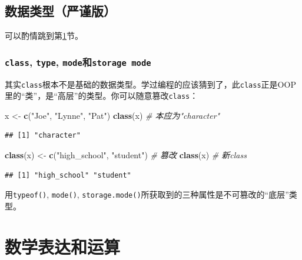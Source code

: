 \documentclass[]{book}
\newenvironment{Shaded}{\begin{snugshade}}{\end{snugshade}}
\newcommand{\CommentTok}[1]{\textcolor[rgb]{0.56,0.35,0.01}{\textit{#1}}}
\newcommand{\KeywordTok}[1]{\textcolor[rgb]{0.13,0.29,0.53}{\textbf{#1}}}
\newcommand{\NormalTok}[1]{#1}
\newcommand{\StringTok}[1]{\textcolor[rgb]{0.31,0.60,0.02}{#1}}
\begin{document}
\hypertarget{data-types-advanced}{%
\subsection{数据类型（严谨版）}\label{data-types-advanced}}

可以酌情跳到第\ref{math}节。

\hypertarget{class-type-modestorage-mode}{%
\subsubsection{\texorpdfstring{\texttt{class}, \texttt{type}, \texttt{mode}和\texttt{storage\ mode}}{class, type, mode和storage mode}}\label{class-type-modestorage-mode}}

其实\texttt{class}根本不是基础的数据类型。学过编程的应该猜到了，此\texttt{class}正是OOP里的``类''，是``高层''的类型。你可以随意篡改\texttt{class}：

\begin{Shaded}
\begin{Highlighting}[]
\NormalTok{x <-}\StringTok{ }\KeywordTok{c}\NormalTok{(}\StringTok{"Joe"}\NormalTok{, }\StringTok{"Lynne"}\NormalTok{, }\StringTok{"Pat"}\NormalTok{)}
\KeywordTok{class}\NormalTok{(x) }\CommentTok{# 本应为"character"}
\end{Highlighting}
\end{Shaded}

\begin{verbatim}
## [1] "character"
\end{verbatim}

\begin{Shaded}
\begin{Highlighting}[]
\KeywordTok{class}\NormalTok{(x) <-}\StringTok{ }\KeywordTok{c}\NormalTok{(}\StringTok{"high_school"}\NormalTok{, }\StringTok{"student"}\NormalTok{) }\CommentTok{# 篡改}
\KeywordTok{class}\NormalTok{(x) }\CommentTok{# 新class}
\end{Highlighting}
\end{Shaded}

\begin{verbatim}
## [1] "high_school" "student"
\end{verbatim}

用\texttt{typeof()}, \texttt{mode()}, \texttt{storage.mode()}所获取到的三种属性是不可篡改的``底层''类型。

\hypertarget{math}{%
\section{数学表达和运算}\label{math}}
\end{document}

